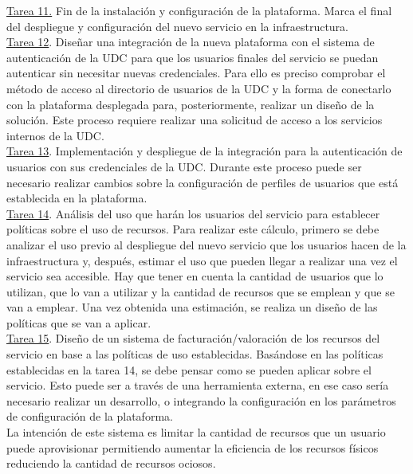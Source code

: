 \underline{Tarea 11.} Fin de la instalación y configuración de la plataforma. Marca el final del despliegue y configuración del nuevo servicio en la infraestructura.\\

\underline{Tarea 12}. Diseñar una integración de la nueva plataforma con el sistema de autenticación de la UDC para que los usuarios finales del servicio se puedan autenticar sin necesitar nuevas credenciales. Para ello es preciso comprobar el método de acceso al directorio de usuarios de la UDC y la forma de conectarlo con la plataforma desplegada para, posteriormente, realizar un diseño de la solución. Este proceso requiere realizar una solicitud de acceso a los servicios internos de la UDC.\\

\underline{Tarea 13}. Implementación y despliegue de la integración para la autenticación de usuarios con sus credenciales de la UDC. Durante este proceso puede ser necesario realizar cambios sobre la configuración de perfiles de usuarios que está establecida en la plataforma.\\

\underline{Tarea 14}. Análisis del uso que harán los usuarios del servicio para establecer políticas sobre el uso de recursos. Para realizar este cálculo, primero se debe analizar el uso previo al despliegue del nuevo servicio que los usuarios hacen de la infraestructura y, después, estimar el uso que pueden llegar a realizar una vez el servicio sea accesible. Hay que tener en cuenta la cantidad de usuarios que lo utilizan, que lo van a utilizar y la cantidad de recursos que se emplean y que se van a emplear. Una vez obtenida una estimación, se realiza un diseño de las políticas que se van a aplicar.\\

\underline{Tarea 15}. Diseño de un sistema de facturación/valoración de los recursos del servicio en base a las políticas de uso establecidas. Basándose en las políticas establecidas en la tarea 14, se debe pensar como se pueden aplicar sobre el servicio. Esto puede ser a través de una herramienta externa, en ese caso sería necesario realizar un desarrollo, o integrando la configuración en los parámetros de configuración de la plataforma.\\
La intención de este sistema es limitar la cantidad de recursos que un usuario puede aprovisionar permitiendo aumentar la eficiencia de los recursos físicos reduciendo la cantidad de recursos ociosos.\\

